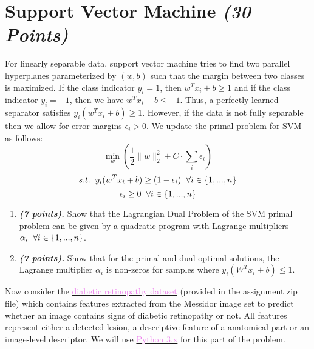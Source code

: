 \documentclass[a4paper]{article}
\begin{document}
\section{Support Vector Machine \textit{(30 Points)}}
For linearly separable data, support vector machine tries to find two parallel hyperplanes parameterized by $(w,b)$ such that the margin between two classes is maximized. If the class indicator $y_i = 1$, then $w^Tx_i + b \geq 1$ and if the class indicator $y_i = -1$, then we have $w^Tx_i + b \leq -1$. Thus, a perfectly learned separator satisfies $y_i(w^Tx_i + b) \geq 1$. However, if the data is not fully separable then we allow for error margins $\epsilon_i > 0$. We update the primal problem for SVM as follows:
$$\min_w \left(\frac{1}{2} \|w\|_2^2 + C\cdot\sum_i\epsilon_i\right)$$
$$s.t. \hspace{0.2 cm}  y_i(w^Tx_i + b)\geq(1-\epsilon_i) \hspace{0.2 cm} \forall i \in \{1,...,n\}$$
$$ \epsilon_i \geq 0 \hspace{0.2 cm} \forall i \in \{1,...,n\}$$
\begin{enumerate}
    \item \textbf{\textit{(7 points).}} Show that the Lagrangian Dual Problem of the SVM primal problem can be given by a quadratic program with Lagrange multipliers $\alpha_i \hspace{0.2 cm} \forall i \in \{1,...,n\} $. 
    \item \textbf{\textit{(7 points).}} Show that for the primal and dual optimal solutions, the Lagrange multiplier $\alpha_i$ is non-zeros for samples where $y_i(W^Tx_i+b)\leq1$.
\end{enumerate}
Now consider the \hyperlink{https://archive.ics.uci.edu/ml/datasets/Diabetic+Retinopathy+Debrecen+Data+Set}{ \textcolor{violet}{diabetic retinopathy dataset}} (provided in the assignment zip file) which contains features extracted from the Messidor image set to predict whether an image contains signs of diabetic retinopathy or not. All features represent either a detected lesion, a descriptive feature of a anatomical part or an image-level descriptor. We will use \hyperlink{https://docs.python.org/3/}{\textcolor{violet}{Python 3.x}} for this part of the problem.
\end{document}
